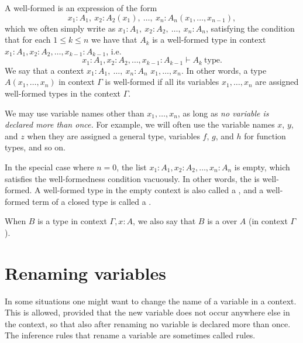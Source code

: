 A well-formed  is an expression of the form
\begin{equation*}
x_1:A_1,~x_2:A_2(x_1),~\ldots,~x_n:A_n(x_1,\ldots,x_{n-1}),
\end{equation*}
which we often simply write as $x_1:A_1,~x_2:A_2,~\ldots,~x_n:A_n$,
satisfying the condition that for each $1\leq k\leq n$ we have that $A_k$ is a well-formed type in context $x_1:A_1,x_2:A_2,\ldots,x_{k-1}:A_{k-1}$, i.e.
\begin{equation*}
x_1:A_1,x_2:A_2,\ldots,x_{k-1}:A_{k-1} \vdash A_k~\textrm{type}.
\end{equation*}
We say that a context $x_1:A_1,~\ldots,~x_n:A_n$  $x_1,\ldots,x_n$. In other words, a type $A(x_1,\ldots,x_n)$ in context $\Gamma$ is well-formed if all its variables $x_1,\ldots,x_n$ are assigned well-formed types in the context $\Gamma$.

We may use variable names other than $x_1,\ldots,x_n$, as long as \emph{no variable is declared more than once.} For example, we will often use the variable names $x$, $y$, and $z$ when they are assigned a general type, variables $f$, $g$, and $h$ for function types, and so on.

In the special case where $n=0$, the list $x_1:A_1,x_2:A_2,\ldots,x_n:A_n$ is empty, which satisfies the well-formedness condition vacuously. In other words, the  is well-formed. A well-formed type in the empty context is also called a , and a well-formed term of a closed type is called a .

When $B$ is a type in context $\Gamma,x:A$, we also say that $B$ is a  over $A$ (in context $\Gamma$).

\section{Renaming variables}
In some situations one might want to change the name of a variable in a context. This is allowed, provided that the new variable does not occur anywhere else in the context, so that also after renaming no variable is declared more than once. 
The inference rules that rename a variable are sometimes called  rules. 

